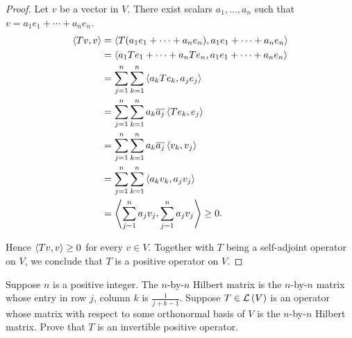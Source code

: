 \begin{proof}
    Let $v$ be a vector in $V$. There exist scalars $a_{1}, \ldots, a_{n}$ such that $v = a_{1}e_{1} + \cdots + a_{n}e_{n}$.
    \begin{align*}
        \left\langle{Tv, v}\right\rangle & = \left\langle{T(a_{1}e_{1} + \cdots + a_{n}e_{n}), a_{1}e_{1} + \cdots + a_{n}e_{n}}\right\rangle \\
                          & = \left\langle{a_{1}Te_{1} + \cdots + a_{n}Te_{n}, a_{1}e_{1} + \cdots + a_{n}e_{n}}\right\rangle  \\
                          & = \sum^{n}_{j=1}\sum^{n}_{k=1}\left\langle{a_{k}Te_{k}, a_{j}e_{j}}\right\rangle                   \\
                          & = \sum^{n}_{j=1}\sum^{n}_{k=1}a_{k}\overline{a_{j}}\left\langle{Te_{k}, e_{j}}\right\rangle            \\
                          & = \sum^{n}_{j=1}\sum^{n}_{k=1}a_{k}\overline{a_{j}}\left\langle{v_{k}, v_{j}}\right\rangle             \\
                          & = \sum^{n}_{j=1}\sum^{n}_{k=1}\left\langle{a_{k}v_{k}, a_{j}v_{j}}\right\rangle                    \\
                          & = \left\langle{\sum^{n}_{j=1}a_{j}v_{j}, \sum^{n}_{j=1}a_{j}v_{j}}\right\rangle \geq 0.
    \end{align*}

    Hence $\left\langle{Tv, v}\right\rangle\geq 0$ for every $v\in V$. Together with $T$ being a self-adjoint operator on $V$, we conclude that $T$ is a positive operator on $V$.
\end{proof}
\newpage

\begin{exercise}
    Suppose $n$ is a positive integer. The $n$-by-$n$ Hilbert matrix is the $n$-by-$n$ matrix whose entry in row $j$, column $k$ is $\frac{1}{j + k - 1}$. Suppose $T\in\mathcal{L}\left({V}\right)$ is an operator whose matrix with respect to some orthonormal basis of $V$ is the $n$-by-$n$ Hilbert matrix. Prove that $T$ is an invertible positive operator.
\end{exercise}

